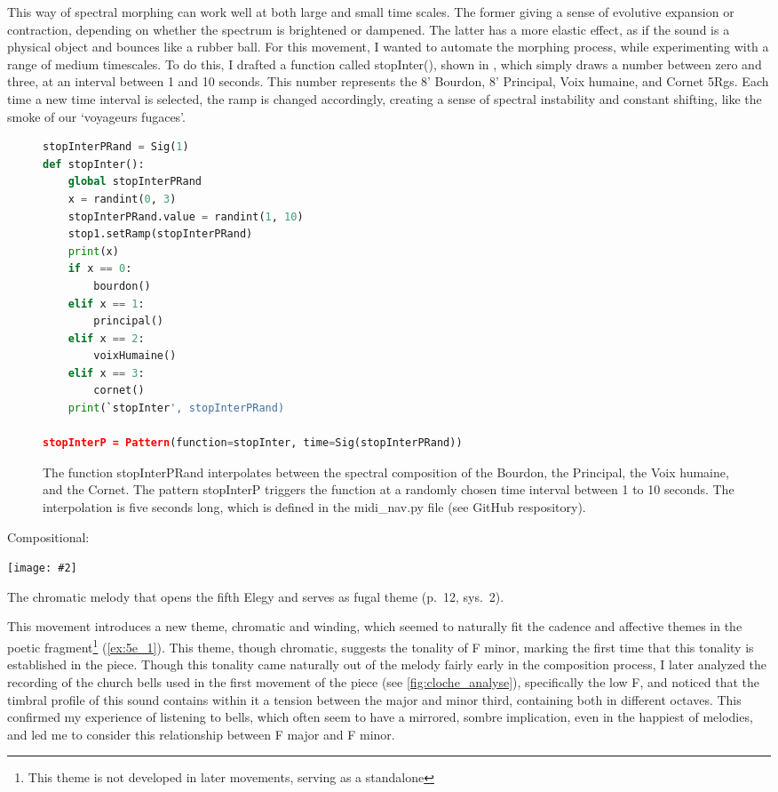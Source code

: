 \documentclass[12pt,twoside,maitrise]{dms_ks}
\newcommand{\customincludeexamples}[4][]{%
    \begin{example}[H]
        \centering
        \texttt{[image: \#2]}
        \caption{#4}
	\label{#3} 
    \end{example}
}
\theoremstyle{definition}
\begin{document}
{{This way of spectral morphing can work well at both large and small time scales.
The former giving a sense of evolutive expansion or contraction, depending on whether the spectrum is brightened or dampened.
The latter has a more elastic effect, as if the sound is a physical object and bounces like a rubber ball.
For this movement, I wanted to automate the morphing process, while experimenting with a range of medium timescales.
To do this, I drafted a function called stopInter(), shown in , which simply draws a number between zero and three, at an interval between 1 and 10 seconds.
This number represents the 8' Bourdon, 8' Principal, Voix humaine, and Cornet 5Rgs.
Each time a new time interval is selected, the ramp is changed accordingly, creating a sense of spectral instability and constant shifting, like the smoke of our `voyageurs fugaces'.
\begin{figure}[H]
\begin{lstlisting}[language=Python]
stopInterPRand = Sig(1)
def stopInter():
    global stopInterPRand
    x = randint(0, 3)
    stopInterPRand.value = randint(1, 10)
    stop1.setRamp(stopInterPRand)
    print(x)
    if x == 0:
        bourdon()
    elif x == 1:
        principal()
    elif x == 2:
        voixHumaine()
    elif x == 3:
        cornet()
    print(`stopInter', stopInterPRand)

stopInterP = Pattern(function=stopInter, time=Sig(stopInterPRand))
\end{lstlisting}
\caption{The function stopInterPRand interpolates between the spectral composition of the Bourdon, the Principal, the Voix humaine, and the Cornet. The pattern stopInterP triggers the function at a randomly chosen time interval between 1 to 10 seconds. The interpolation is five seconds long, which is defined in the midi\_nav.py file (see GitHub respository).}
\label{fig:stopinter}
\end{figure}

Compositional:

\customincludeexamples[width=\textwidth]{5e_1}{ex:5e_1}{The chromatic melody that opens the fifth Elegy and serves as fugal theme (p.~12, sys.~2).}

This movement introduces a new theme, chromatic and winding, which seemed to naturally fit the cadence and affective themes in the poetic fragment\footnote{This theme is not developed in later movements, serving as a standalone} (\cref{ex:5e_1}).
This theme, though chromatic, suggests the tonality of F minor, marking the first time that this tonality is established in the piece.
Though this tonality came naturally out of the melody fairly early in the composition process, I later analyzed the recording of the church bells used in the first movement of the piece (see \cref{fig:cloche_analyse}), specifically the low F, and noticed that the timbral profile of this sound contains within it a tension between the major and minor third, containing both in different octaves.
This confirmed my experience of listening to bells, which often seem to have a mirrored, sombre implication, even in the happiest of melodies, and led me to consider this relationship between F major and F minor. 

}}
\end{document}
